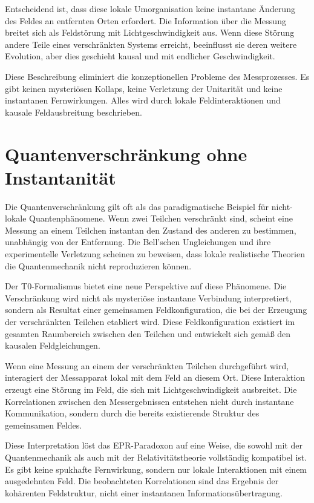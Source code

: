 	Entscheidend ist, dass diese lokale Umorganisation keine instantane Änderung des Feldes an entfernten Orten erfordert. Die Information über die Messung breitet sich als Feldstörung mit Lichtgeschwindigkeit aus. Wenn diese Störung andere Teile eines verschränkten Systems erreicht, beeinflusst sie deren weitere Evolution, aber dies geschieht kausal und mit endlicher Geschwindigkeit.
	
	Diese Beschreibung eliminiert die konzeptionellen Probleme des Messprozesses. Es gibt keinen mysteriösen Kollaps, keine Verletzung der Unitarität und keine instantanen Fernwirkungen. Alles wird durch lokale Feldinteraktionen und kausale Feldausbreitung beschrieben.
	
	\section{Quantenverschränkung ohne Instantanität}
	
	Die Quantenverschränkung gilt oft als das paradigmatische Beispiel für nicht-lokale Quantenphänomene. Wenn zwei Teilchen verschränkt sind, scheint eine Messung an einem Teilchen instantan den Zustand des anderen zu bestimmen, unabhängig von der Entfernung. Die Bell'schen Ungleichungen und ihre experimentelle Verletzung scheinen zu beweisen, dass lokale realistische Theorien die Quantenmechanik nicht reproduzieren können.
	
	Der T0-Formalismus bietet eine neue Perspektive auf diese Phänomene. Die Verschränkung wird nicht als mysteriöse instantane Verbindung interpretiert, sondern als Resultat einer gemeinsamen Feldkonfiguration, die bei der Erzeugung der verschränkten Teilchen etabliert wird. Diese Feldkonfiguration existiert im gesamten Raumbereich zwischen den Teilchen und entwickelt sich gemäß den kausalen Feldgleichungen.
	
	Wenn eine Messung an einem der verschränkten Teilchen durchgeführt wird, interagiert der Messapparat lokal mit dem Feld an diesem Ort. Diese Interaktion erzeugt eine Störung im Feld, die sich mit Lichtgeschwindigkeit ausbreitet. Die Korrelationen zwischen den Messergebnissen entstehen nicht durch instantane Kommunikation, sondern durch die bereits existierende Struktur des gemeinsamen Feldes.
	
	Diese Interpretation löst das EPR-Paradoxon auf eine Weise, die sowohl mit der Quantenmechanik als auch mit der Relativitätstheorie vollständig kompatibel ist. Es gibt keine spukhafte Fernwirkung, sondern nur lokale Interaktionen mit einem ausgedehnten Feld. Die beobachteten Korrelationen sind das Ergebnis der kohärenten Feldstruktur, nicht einer instantanen Informationsübertragung.
